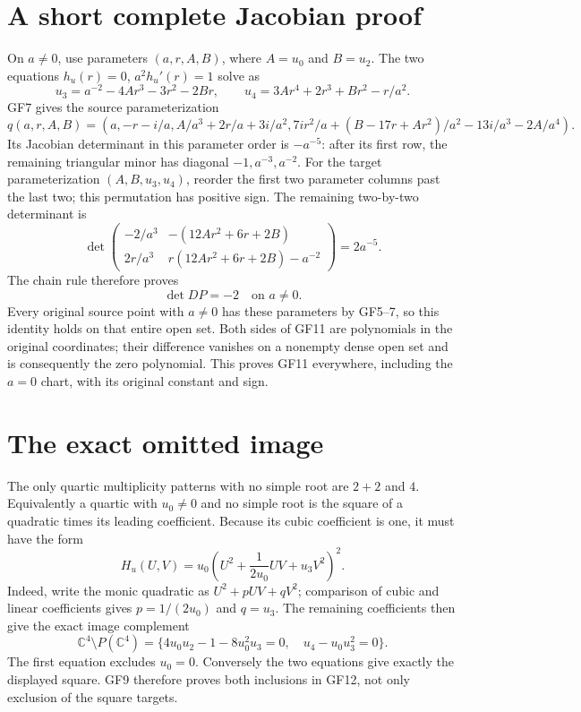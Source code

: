 \documentclass[11pt]{article}
\newcommand{\C}{\mathbb C}
\begin{document}
\section{A short complete Jacobian proof}
On $a\ne0$, use parameters $(a,r,A,B)$, where $A=u_0$ and $B=u_2$.
The two equations $h_u(r)=0$, $a^2h_u'(r)=1$ solve as
\begin{equation}
 u_3=a^{-2}-4Ar^3-3r^2-2Br,
 \qquad u_4=3Ar^4+2r^3+Br^2-r/a^2.\tag{GF10}
\end{equation}
GF7 gives the source parameterization
\[
 q(a,r,A,B)=\left(a,-r-i/a,A/a^3+2r/a+3i/a^2,
 7ir^2/a+(B-17r+Ar^2)/a^2-13i/a^3-2A/a^4\right).
\]
Its Jacobian determinant in this parameter order is $-a^{-5}$:
after its first row, the remaining triangular minor has diagonal
$-1,a^{-3},a^{-2}$. For the target parameterization
$(A,B,u_3,u_4)$, reorder the first two parameter columns past the
last two; this permutation has positive sign. The remaining
two-by-two determinant is
\[
 \det\begin{pmatrix}
 -2/a^3&-(12Ar^2+6r+2B)\\
 2r/a^3&r(12Ar^2+6r+2B)-a^{-2}
 \end{pmatrix}=2a^{-5}.
\]
The chain rule therefore proves
\begin{equation}
 \det DP=-2\quad\text{on }a\ne0.\tag{GF11}
\end{equation}
Every original source point with $a\ne0$ has these parameters by
GF5--7, so this identity holds on that entire open set. Both sides
of GF11 are polynomials in the original coordinates; their
difference vanishes on a nonempty dense open set and is consequently
the zero polynomial. This proves GF11 everywhere, including the
$a=0$ chart, with its original constant and sign.

\section{The exact omitted image}
The only quartic multiplicity patterns with no simple root are
$2+2$ and $4$. Equivalently a quartic with $u_0\ne0$ and no simple
root is the square of a quadratic times its leading coefficient.
Because its cubic coefficient is one, it must have the form
\[
 H_u(U,V)=u_0\left(U^2+\frac{1}{2u_0}UV+u_3V^2\right)^2.
\]
Indeed, write the monic quadratic as $U^2+pUV+qV^2$; comparison
of cubic and linear coefficients gives $p=1/(2u_0)$ and $q=u_3$.
The remaining coefficients then give the exact image complement
\begin{equation}
 \C^4\setminus P(\C^4)
 =\{4u_0u_2-1-8u_0^2u_3=0,\quad u_4-u_0u_3^2=0\}.
 \tag{GF12}
\end{equation}
The first equation excludes $u_0=0$. Conversely the two equations
give exactly the displayed square. GF9 therefore proves both
inclusions in GF12, not only exclusion of the square targets.
\end{document}

